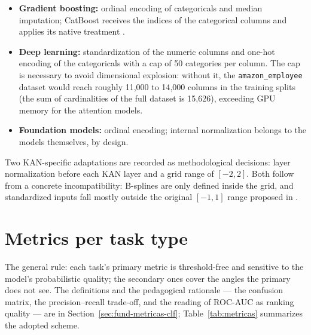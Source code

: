 \begin{itemize}
  \item \textbf{Gradient boosting:} ordinal encoding of categoricals
    and median imputation; CatBoost receives the indices of the
    categorical columns and applies its native treatment
    \citep{prokhorenkova2018}.
  \item \textbf{Deep learning:} standardization of the numeric
    columns and one-hot encoding of the categoricals with a cap of
    50 categories per column. The cap is necessary to avoid
    dimensional explosion: without it, the
    \texttt{amazon\_\allowbreak employee} dataset would reach
    roughly 11{,}000 to 14{,}000 columns in the training splits
    (the sum of cardinalities of the full dataset is 15{,}626),
    exceeding GPU memory for the attention models.
  \item \textbf{Foundation models:} ordinal encoding; internal
    normalization belongs to the models themselves, by design.
\end{itemize}

Two KAN-specific adaptations are recorded as methodological
decisions: layer normalization before each KAN layer and a grid range
of $[-2, 2]$. Both follow from a concrete incompatibility: B-splines
are only defined inside the grid, and standardized inputs fall mostly
outside the original $[-1, 1]$ range proposed in \citet{kan2024}.

\section{Metrics per task type}
\label{sec:met-metricas}

The general rule: each task's primary metric is threshold-free and
sensitive to the model's probabilistic quality; the secondary ones
cover the angles the primary does not see. The definitions and the
pedagogical rationale --- the confusion matrix, the
precision--recall trade-off, and the reading of ROC-AUC as ranking
quality --- are in Section~\ref{sec:fund-metricas-clf};
Table~\ref{tab:metricas} summarizes the adopted scheme.

